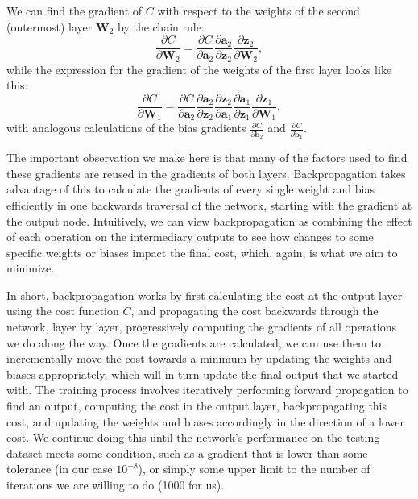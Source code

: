 We can find the gradient of $C$ with respect to the weights of the second (outermost) layer $\mathbf W_2$ by the chain rule:
\[\frac{\partial C}{\partial \mathbf W_2} = \frac{\partial C}{\partial \boldsymbol a_2}
\frac{\partial \boldsymbol a_2}{\partial \boldsymbol z_2}
\frac{\partial \boldsymbol z_2}{\partial \mathbf W_2},\]
while the expression for the gradient of the weights of the first layer looks like this:
\[\frac{\partial C}{\partial \mathbf W_1} = \frac{\partial C}{\partial \boldsymbol a_2}
\frac{\partial \boldsymbol a_2}{\partial \boldsymbol z_2}
\frac{\partial \boldsymbol z_2}{\partial \boldsymbol a_1}
\frac{\partial \boldsymbol a_1}{\partial \boldsymbol z_1}
\frac{\partial \boldsymbol z_1}{\partial \mathbf W_1},\]
with analogous calculations of the bias gradients $\frac{\partial C}{\partial \boldsymbol b_2}$ and $\frac{\partial C}{\partial \boldsymbol b_1}$. 

The important observation we make here is that many of the factors used to find these gradients are reused in the gradients of both layers. Backpropagation takes advantage of this to calculate the gradients of every single weight and bias efficiently in one backwards traversal of the network, starting with the gradient at the output node. Intuitively, we can view backpropagation as combining the effect of each operation on the intermediary outputs to see how changes to some specific weights or biases impact the final cost, which, again, is what we aim to minimize. 

In short, backpropagation works by first calculating the cost at the output layer using the cost function $C$, and propagating the cost backwards through the network, layer by layer, progressively computing the gradients of all operations we do along the way. Once the gradients are calculated, we can use them to incrementally move the cost towards a minimum by updating the weights and biases appropriately, which will in turn update the final output that we started with. The training process involves iteratively performing forward propagation to find an output, computing the cost in the output layer, backpropagating this cost, and updating the weights and biases accordingly in the direction of a lower cost. We continue doing this until the network's performance on the testing dataset meets some condition, such as a gradient that is lower than some tolerance (in our case $10^{-8}$), or simply some upper limit to the number of iterations we are willing to do (1000 for us).

